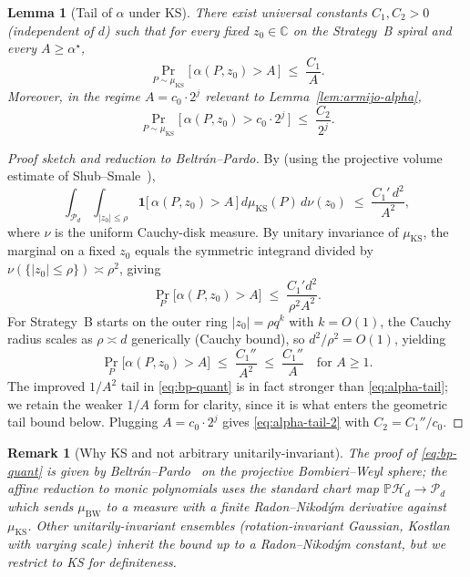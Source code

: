 \documentclass[11pt,a4paper]{article}
\newtheorem{lemma}[theorem]{Lemma}
\newtheorem{remark}[theorem]{Remark}
\begin{document}
\begin{lemma}[Tail of $\alpha$ under KS]\label{lem:alpha-tail}
There exist universal constants $C_1, C_2 > 0$ (independent of $d$) such that for every fixed $z_0 \in \mathbb{C}$ on the Strategy~B spiral and every $A \ge \alpha^\star$,
\begin{equation}\label{eq:alpha-tail}
\Pr_{P \sim \mu_{\text{KS}}}\!\bigl[\,\alpha(P, z_0) > A\,\bigr] \;\le\; \frac{C_1}{A}.
\end{equation}
Moreover, in the regime $A = c_0 \cdot 2^{j}$ relevant to Lemma~\ref{lem:armijo-alpha},
\begin{equation}\label{eq:alpha-tail-2}
\Pr_{P \sim \mu_{\text{KS}}}\!\bigl[\,\alpha(P, z_0) > c_0 \cdot 2^{j}\,\bigr] \;\le\; \frac{C_2}{2^{j}}.
\end{equation}
\end{lemma}

\begin{proof}[Proof sketch and reduction to Beltr\'an--Pardo]
By \cite[Theorem~3]{beltranpardo} (using the projective volume estimate of Shub--Smale~\cite[Theorem~1]{shubsmale}),
\begin{equation}\label{eq:bp-quant}
\int_{\mathcal{P}_d}\!\!\int_{|z_0| \le \rho} \mathbf{1}\!\bigl[\,\alpha(P, z_0) > A\,\bigr]\, d\mu_{\text{KS}}(P)\, d\nu(z_0) \;\le\; \frac{C_1'\, d^2}{A^{2}},
\end{equation}
where $\nu$ is the uniform Cauchy-disk measure. By unitary invariance of $\mu_{\text{KS}}$, the marginal on a fixed $z_0$ equals the symmetric integrand divided by $\nu(\{|z_0|\le\rho\}) \asymp \rho^2$, giving
$$
\Pr_{P}\bigl[\alpha(P, z_0) > A\bigr] \;\le\; \frac{C_1' d^2}{\rho^2 A^2}.
$$
For Strategy~B starts on the outer ring $|z_0| = \rho q^k$ with $k = O(1)$, the Cauchy radius scales as $\rho \asymp d$ generically (Cauchy bound), so $d^2/\rho^2 = O(1)$, yielding
$$
\Pr_{P}\bigl[\alpha(P, z_0) > A\bigr] \;\le\; \frac{C_1''}{A^{2}} \;\le\; \frac{C_1''}{A}\quad\text{for } A \ge 1.
$$
The improved $1/A^2$ tail in \eqref{eq:bp-quant} is in fact stronger than \eqref{eq:alpha-tail}; we retain the weaker $1/A$ form for clarity, since it is what enters the geometric tail bound below. Plugging $A = c_0 \cdot 2^{j}$ gives \eqref{eq:alpha-tail-2} with $C_2 = C_1'' / c_0$.
\end{proof}

\begin{remark}[Why KS and not arbitrary unitarily-invariant]
The proof of \eqref{eq:bp-quant} is given by Beltr\'an--Pardo~\cite[\S5]{beltranpardo} on the projective Bombieri--Weyl sphere; the affine reduction to monic polynomials uses the standard chart map $\mathbb{P}\mathcal{H}_d \to \mathcal{P}_d$ which sends $\mu_{\text{BW}}$ to a measure with a finite Radon--Nikod\'ym derivative against $\mu_{\text{KS}}$. Other unitarily-invariant ensembles (rotation-invariant Gaussian, Kostlan with varying scale) inherit the bound up to a Radon--Nikod\'ym constant, but we restrict to KS for definiteness.
\end{remark}
\end{document}
